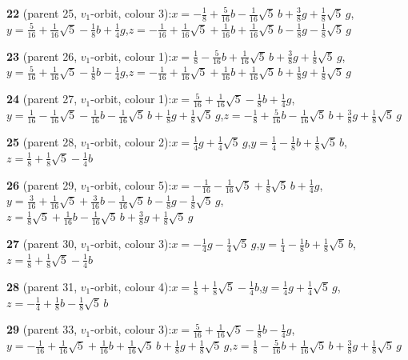 \documentclass[10pt]{article}
\begin{document}
{\noindent\textbf{22} (parent 25, $v_1$-orbit, colour 3):\quad $x=-\tfrac{1}{8}+\tfrac{5}{16}b-\tfrac{1}{16}\sqrt5\,b+\tfrac{3}{8}g+\tfrac{1}{8}\sqrt5\,g$,\quad $y=\tfrac{5}{16}+\tfrac{1}{16}\sqrt5-\tfrac{1}{8}b+\tfrac{1}{4}g$,\quad $z=-\tfrac{1}{16}+\tfrac{1}{16}\sqrt5+\tfrac{1}{16}b+\tfrac{1}{16}\sqrt5\,b-\tfrac{1}{8}g-\tfrac{1}{8}\sqrt5\,g$\par\smallskip
\noindent\textbf{23} (parent 26, $v_1$-orbit, colour 1):\quad $x=\tfrac{1}{8}-\tfrac{5}{16}b+\tfrac{1}{16}\sqrt5\,b+\tfrac{3}{8}g+\tfrac{1}{8}\sqrt5\,g$,\quad $y=\tfrac{5}{16}+\tfrac{1}{16}\sqrt5-\tfrac{1}{8}b-\tfrac{1}{4}g$,\quad $z=-\tfrac{1}{16}+\tfrac{1}{16}\sqrt5+\tfrac{1}{16}b+\tfrac{1}{16}\sqrt5\,b+\tfrac{1}{8}g+\tfrac{1}{8}\sqrt5\,g$\par\smallskip
\noindent\textbf{24} (parent 27, $v_1$-orbit, colour 1):\quad $x=\tfrac{5}{16}+\tfrac{1}{16}\sqrt5-\tfrac{1}{8}b+\tfrac{1}{4}g$,\quad $y=\tfrac{1}{16}-\tfrac{1}{16}\sqrt5-\tfrac{1}{16}b-\tfrac{1}{16}\sqrt5\,b+\tfrac{1}{8}g+\tfrac{1}{8}\sqrt5\,g$,\quad $z=-\tfrac{1}{8}+\tfrac{5}{16}b-\tfrac{1}{16}\sqrt5\,b+\tfrac{3}{8}g+\tfrac{1}{8}\sqrt5\,g$\par\smallskip
\noindent\textbf{25} (parent 28, $v_1$-orbit, colour 2):\quad $x=\tfrac{1}{4}g+\tfrac{1}{4}\sqrt5\,g$,\quad $y=\tfrac{1}{4}-\tfrac{1}{8}b+\tfrac{1}{8}\sqrt5\,b$,\quad $z=\tfrac{1}{8}+\tfrac{1}{8}\sqrt5-\tfrac{1}{4}b$\par\smallskip
\noindent\textbf{26} (parent 29, $v_1$-orbit, colour 5):\quad $x=-\tfrac{1}{16}-\tfrac{1}{16}\sqrt5+\tfrac{1}{8}\sqrt5\,b+\tfrac{1}{4}g$,\quad $y=\tfrac{3}{16}+\tfrac{1}{16}\sqrt5+\tfrac{3}{16}b-\tfrac{1}{16}\sqrt5\,b-\tfrac{1}{8}g-\tfrac{1}{8}\sqrt5\,g$,\quad $z=\tfrac{1}{8}\sqrt5+\tfrac{1}{16}b-\tfrac{1}{16}\sqrt5\,b+\tfrac{3}{8}g+\tfrac{1}{8}\sqrt5\,g$\par\smallskip
\noindent\textbf{27} (parent 30, $v_1$-orbit, colour 3):\quad $x=-\tfrac{1}{4}g-\tfrac{1}{4}\sqrt5\,g$,\quad $y=\tfrac{1}{4}-\tfrac{1}{8}b+\tfrac{1}{8}\sqrt5\,b$,\quad $z=\tfrac{1}{8}+\tfrac{1}{8}\sqrt5-\tfrac{1}{4}b$\par\smallskip
\noindent\textbf{28} (parent 31, $v_1$-orbit, colour 4):\quad $x=\tfrac{1}{8}+\tfrac{1}{8}\sqrt5-\tfrac{1}{4}b$,\quad $y=\tfrac{1}{4}g+\tfrac{1}{4}\sqrt5\,g$,\quad $z=-\tfrac{1}{4}+\tfrac{1}{8}b-\tfrac{1}{8}\sqrt5\,b$\par\smallskip
\noindent\textbf{29} (parent 33, $v_1$-orbit, colour 3):\quad $x=\tfrac{5}{16}+\tfrac{1}{16}\sqrt5-\tfrac{1}{8}b-\tfrac{1}{4}g$,\quad $y=-\tfrac{1}{16}+\tfrac{1}{16}\sqrt5+\tfrac{1}{16}b+\tfrac{1}{16}\sqrt5\,b+\tfrac{1}{8}g+\tfrac{1}{8}\sqrt5\,g$,\quad $z=\tfrac{1}{8}-\tfrac{5}{16}b+\tfrac{1}{16}\sqrt5\,b+\tfrac{3}{8}g+\tfrac{1}{8}\sqrt5\,g$\par\smallskip
}
\end{document}
